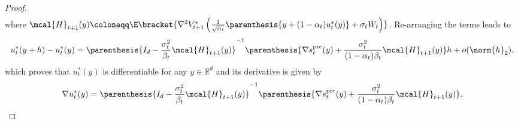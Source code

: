 \documentclass{article}
\newcommand{\R}{\mathbb{R}}
\begin{document}
\begin{proof}
\begin{align*}
\end{align*}
where $\mcal{H}_{t+1}(y) \coloneqq \E\bracket{\nabla^2 V_{t+1}^{*}\left(\frac{1}{\sqrt{\alpha_t}}\parenthesis{y + (1 - \alpha_t)u_t^*(y)} + \sigma_t W_t\right)}  $.
Re-arranging the terms leads to
\begin{align*}
    u_t^*(y+h) - u_t^*(y) = \parenthesis{I_d - \frac{\sigma_t^2}{\beta_t}\mcal{H}_{t+1}(y)}^{-1}\parenthesis{\nabla s_t^{\rm pre}(y) + \frac{\sigma_t^2}{(1 - \alpha_t)\beta_t}\mcal{H}_{t+1}(y)}h + o(\norm{h}_2),
\end{align*}
which proves that $u_t^*(y)$ is differentiable for any $y\in \R^d$ and its derivative is given by 
\begin{align}\label{eq:grad u*-re}
    \nabla u_t^*(y) = \parenthesis{I_d - \frac{\sigma_t^2}{\beta_t}\mcal{H}_{t+1}(y)}^{-1}\parenthesis{\nabla s_t^{\rm pre}(y) + \frac{\sigma_t^2}{(1 - \alpha_t)\beta_t}\mcal{H}_{t+1}(y)}.
\end{align}


\end{proof}
\end{document}
